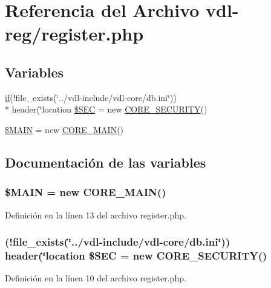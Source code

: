 \hypertarget{register_8php}{\section{Referencia del Archivo vdl-\/reg/register.php}
\label{register_8php}
}
\subsection*{Variables}
\begin{DoxyCompactItemize}
\item 
\hyperlink{index_8php_a03ed0eadab502a2cb754ef4963570e97}{if}(!file\-\_\-exists(\char`\"{}../vdl-\/include/vdl-\/core/db.\-ini\char`\"{})) \\*
header(\char`\"{}location \hyperlink{register_8php_a3208c16a46c3858eb2c9bec5216e2874}{\$\-S\-E\-C} = new \hyperlink{classCORE__SECURITY}{C\-O\-R\-E\-\_\-\-S\-E\-C\-U\-R\-I\-T\-Y}()
\item 
\hyperlink{register_8php_aa3efd4a61925b50d9d066bd2b42dcd3d}{\$\-M\-A\-I\-N} = new \hyperlink{classCORE__MAIN}{C\-O\-R\-E\-\_\-\-M\-A\-I\-N}()
\end{DoxyCompactItemize}


\subsection{Documentación de las variables}
\hypertarget{register_8php_aa3efd4a61925b50d9d066bd2b42dcd3d}{
\subsubsection[{\$\-M\-A\-I\-N}]{\setlength{\rightskip}{0pt plus 5cm}\$M\-A\-I\-N = new {\bf C\-O\-R\-E\-\_\-\-M\-A\-I\-N}()}}\label{register_8php_aa3efd4a61925b50d9d066bd2b42dcd3d}


Definición en la línea 13 del archivo register.\-php.

\hypertarget{register_8php_a3208c16a46c3858eb2c9bec5216e2874}{
\subsubsection[{\$\-S\-E\-C}]{ (!file\-\_\-exists(\char`\"{}../vdl-\/include/vdl-\/core/db.\-ini\char`\"{})) header(\char`\"{}location \$S\-E\-C = new {\bf C\-O\-R\-E\-\_\-\-S\-E\-C\-U\-R\-I\-T\-Y}()}}\label{register_8php_a3208c16a46c3858eb2c9bec5216e2874}


Definición en la línea 10 del archivo register.\-php.

